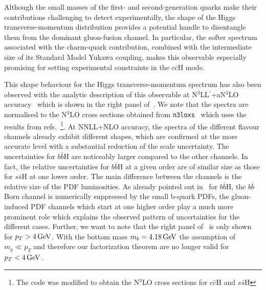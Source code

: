 \documentclass[11pt,a4paper]{article}
\begin{document}
Although the small masses of the first- and second-generation quarks make their contributions challenging to detect experimentally, the shape of the Higgs transverse-momentum distribution provides a potential handle to disentangle them from the dominant gluon-fusion channel. In particular, the softer spectrum associated with the charm-quark contribution, combined with the intermediate size of its Standard Model Yukawa coupling, makes this observable especially promising for setting experimental constraints in the $c\bar c \text{H}$ mode.

This shape behaviour for the Higgs transverse-momentum spectrum has also been observed with the analytic description of this observable at N$^3$LL$^{\prime}$+aN$^3$LO accuracy~\cite{Cal:2023mib} which is shown in the right panel of~.
We note that the spectra are normalised to the N$^3$LO cross sections obtained from \texttt{n3loxs}~\cite{Baglio:2022wzu} which uses the results from refs.~\cite{duhr:2019kwi,Duhr:2020kzd}\footnote{The code was modified to obtain the N$^3$LO cross sections for  $c\bar c \text{H}$ and  $s\bar s \text{H}$}.
At NNLL+NLO accuracy, the spectra of the different flavour channels already exhibit different shapes, which are confirmed at the more accurate \nnnres{} level with a substantial reduction of the scale uncertainty. The uncertainties for $b\bar b \text{H}$ are noticeably larger compared to the other channels.
In fact, the relative uncertainties for $b\bar b \text{H}$ at
a given order are of similar size as those for $s\bar s \text{H}$ at one lower order.
The main difference between the channels is the relative size of the PDF luminosities.
As already pointed out in~ for $b\bar b \text{H}$, the $b\bar b$ Born channel is numerically suppressed by the small b-quark PDFs, the
gluon-induced PDF channels which start at one higher order play a much more prominent role which explains the observed pattern of uncertainties for the different cases. Further, we want to note that the right panel of~ is only shown for $p_T> 4\, \mathrm{GeV}$. With
the bottom mass $m_b = 4.18\, \mathrm{GeV}$ the assumption of $m_q \ll p_T$ and therefore our factorization
theorem are no longer valid for $p_T<4\, \mathrm{GeV}$.
\end{document}
